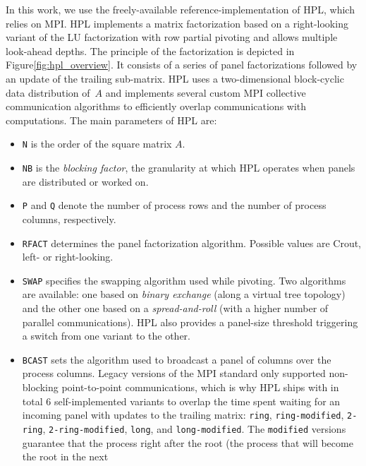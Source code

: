         In this work, we use the freely-available reference-implementation of HPL\cite{hpl}, which relies on MPI.  HPL
        implements a matrix factorization based on a right-looking variant of the LU factorization with row partial pivoting
        and allows multiple look-ahead depths. The principle of the factorization is depicted in
        Figure\ref{fig:hpl_overview}. It consists of a series of panel factorizations followed by an update of the trailing
        sub-matrix.  HPL uses a two-dimensional block-cyclic data distribution of $A$ and implements several custom MPI
        collective communication algorithms to efficiently overlap communications with computations.
        The main parameters of HPL are:
        \begin{itemize}
            \item \texttt{N} is the order of the square matrix $A$.
            \item \texttt{NB} is the \emph{blocking factor}, \ie the granularity at which HPL operates when panels are
                distributed or worked on.
            \item \texttt{P} and \texttt{Q} denote the number of process rows and the number of process columns,
                respectively.
            \item \texttt{RFACT} determines the panel factorization algorithm. Possible values are Crout, left- or
                right-looking.
            \item \texttt{SWAP} specifies the swapping algorithm used while pivoting. Two algorithms are available: one
                based on \emph{binary exchange} (along a virtual tree topology) and the other one based on a
                \emph{spread-and-roll} (with a higher number of parallel communications). HPL also provides a panel-size
                threshold triggering a switch from one variant to the other.
            \item \texttt{BCAST} sets the algorithm used to broadcast a panel of columns over the process columns. Legacy
                versions of the MPI standard only supported non-blocking point-to-point communications, which is why HPL
                ships with in total 6 self-implemented variants to overlap the time spent waiting for an incoming panel with
                updates to the trailing matrix: \texttt{ring}, \texttt{ring-modified}, \texttt{2-ring},
                \texttt{2-ring-modified}, \texttt{long}, and \texttt{long-modified}. The \texttt{modified} versions
                guarantee that the process right after the root (\ie the process that will become the root in the next

\end{itemize}
